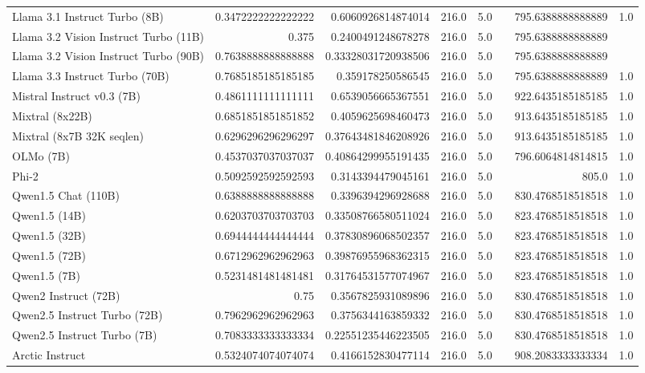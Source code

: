 \begin{table}[htp]
{\begin{tabular}{lrrrrrrr}
Llama 3.1 Instruct Turbo (8B) & 0.3472222222222222 & 0.6060926814874014 & 216.0 & 5.0 &  & 795.6388888888889 & 1.0 \\
Llama 3.2 Vision Instruct Turbo (11B) & 0.375 & 0.2400491248678278 & 216.0 & 5.0 &  & 795.6388888888889 &  \\
Llama 3.2 Vision Instruct Turbo (90B) & 0.7638888888888888 & 0.33328031720938506 & 216.0 & 5.0 &  & 795.6388888888889 &  \\
Llama 3.3 Instruct Turbo (70B) & 0.7685185185185185 & 0.359178250586545 & 216.0 & 5.0 &  & 795.6388888888889 & 1.0 \\
Mistral Instruct v0.3 (7B) & 0.4861111111111111 & 0.6539056665367551 & 216.0 & 5.0 &  & 922.6435185185185 & 1.0 \\
Mixtral (8x22B) & 0.6851851851851852 & 0.4059625698460473 & 216.0 & 5.0 &  & 913.6435185185185 & 1.0 \\
Mixtral (8x7B 32K seqlen) & 0.6296296296296297 & 0.37643481846208926 & 216.0 & 5.0 &  & 913.6435185185185 & 1.0 \\
OLMo (7B) & 0.4537037037037037 & 0.40864299955191435 & 216.0 & 5.0 &  & 796.6064814814815 & 1.0 \\
Phi-2 & 0.5092592592592593 & 0.3143394479045161 & 216.0 & 5.0 &  & 805.0 & 1.0 \\
Qwen1.5 Chat (110B) & 0.6388888888888888 & 0.3396394296928688 & 216.0 & 5.0 &  & 830.4768518518518 & 1.0 \\
Qwen1.5 (14B) & 0.6203703703703703 & 0.33508766580511024 & 216.0 & 5.0 &  & 823.4768518518518 & 1.0 \\
Qwen1.5 (32B) & 0.6944444444444444 & 0.37830896068502357 & 216.0 & 5.0 &  & 823.4768518518518 & 1.0 \\
Qwen1.5 (72B) & 0.6712962962962963 & 0.39876955968362315 & 216.0 & 5.0 &  & 823.4768518518518 & 1.0 \\
Qwen1.5 (7B) & 0.5231481481481481 & 0.31764531577074967 & 216.0 & 5.0 &  & 823.4768518518518 & 1.0 \\
Qwen2 Instruct (72B) & 0.75 & 0.3567825931089896 & 216.0 & 5.0 &  & 830.4768518518518 & 1.0 \\
Qwen2.5 Instruct Turbo (72B) & 0.7962962962962963 & 0.3756344163859332 & 216.0 & 5.0 &  & 830.4768518518518 & 1.0 \\
Qwen2.5 Instruct Turbo (7B) & 0.7083333333333334 & 0.22551235446223505 & 216.0 & 5.0 &  & 830.4768518518518 & 1.0 \\
Arctic Instruct & 0.5324074074074074 & 0.4166152830477114 & 216.0 & 5.0 &  & 908.2083333333334 & 1.0 \\

\end{tabular}}
\end{table}
